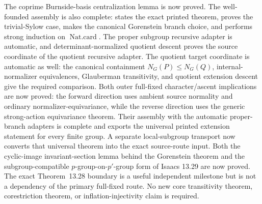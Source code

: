 \documentclass[11pt]{article}
\begin{document}
The coprime Burnside-basis centralization lemma is now proved.  The
well-founded assembly is also complete:
 states the exact
printed theorem, proves the trivial-Sylow case, makes the canonical
Gorenstein branch choice, and performs strong induction on
\(\operatorname{Nat.card}\).  The proper subgroup recursive adapter is
automatic, and determinant-normalized quotient descent proves the source
coordinate of the quotient recursive adapter.  The quotient target
coordinate is automatic as well: the canonical containment
\(N_G(P)\leq N_G(Q)\), internal-normalizer equivalences, Glauberman
transitivity, and quotient extension descent give the required
comparison.  Both outer full-fixed character/ascent implications are now
proved: the forward
direction uses ambient source normality and ordinary
normalizer-equivariance, while the reverse direction uses the generic
strong-action equivariance theorem.  Their assembly with the automatic
proper-branch adapters is complete and exports the universal printed
extension statement for every finite group.  A separate local-subgroup
transport now converts that universal theorem into the exact
source-route input.  Both the
cyclic-image invariant-section lemma behind the Gorenstein theorem and the
subgroup-compatible \(p\)-group-on-\(p'\)-group form of Isaacs 13.29 are
now proved.  The exact Theorem~13.28 boundary is
a useful independent milestone but is not a dependency of the primary
full-fixed route.  No new core transitivity theorem,
corestriction theorem, or inflation-injectivity claim is required.
\end{document}
